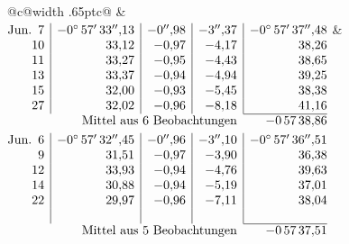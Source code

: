 \noindent\begin{tabular}{@{}c@{\hspace{.4em}\vrule width .65pt\hspace{.4em}}c@{}}
 &
 \\[.18ex]
\(\begin{array}[t]{@{}r|r|r|r|r@{}}
\text{Jun.}\enspace 7 & -0^\circ\,57'\,33''{,}13 & -0''{,}98 & -3''{,}37 & -0^\circ\,57'\,37''{,}48\\
10 & 33{,}12 & -0{,}97 & -4{,}17 & 38{,}26\\
11 & 33{,}27 & -0{,}95 & -4{,}43 & 38{,}65\\
13 & 33{,}37 & -0{,}94 & -4{,}94 & 39{,}25\\
15 & 32{,}00 & -0{,}93 & -5{,}45 & 38{,}38\\
27 & 32{,}02 & -0{,}96 & -8{,}18 & 41{,}16\\
\cline{5-5}
\multicolumn{4}{r}{\text{Mittel aus 6 Beobachtungen}} & -0\,57\,38{,}86
\end{array}\)
&
\(\begin{array}[t]{@{}r|r|r|r|r@{}}
\text{Jun.}\enspace 6 & -0^\circ\,57'\,32''{,}45 & -0''{,}96 & -3''{,}10 & -0^\circ\,57'\,36''{,}51\\
9 & 31{,}51 & -0{,}97 & -3{,}90 & 36{,}38\\
12 & 33{,}93 & -0{,}94 & -4{,}76 & 39{,}63\\
14 & 30{,}88 & -0{,}94 & -5{,}19 & 37{,}01\\
22 & 29{,}97 & -0{,}96 & -7{,}11 & 38{,}04\\
 & & & & \\
\cline{5-5}
\multicolumn{4}{r}{\text{Mittel aus 5 Beobachtungen}} & -0\,57\,37{,}51
\end{array}\)
\end{tabular}\par\medskip
{}
